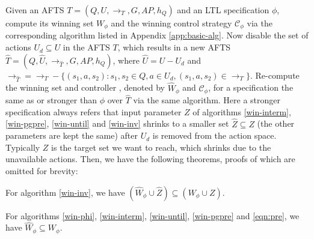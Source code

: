 Given an AFTS $ T = (Q,U,\rightarrow_T,G,AP,h_Q) $ and an LTL specification $ \phi $, compute its winning set $ W_{\phi} $ and the winning control strategy $ \mathcal{C}_{\phi} $  via the corresponding algorithm listed in Appendix \ref{app:basic-alg}. Now disable the set of actions $ U_d \subseteq U$ in the AFTS $ T $, which results in a new AFTS $ \widehat{T} = (Q,\widehat{U},\rightarrow_{\widehat{T}},G,AP,h_Q) $, where  $ \widehat{U} = U-U_d $ and $ \rightarrow_{\widehat{T}} = \rightarrow_T - \{(s_1,a,s_2):s_1,s_2\in Q, a\in U_d, (s_1,a,s_2)\in \rightarrow_T \} $. Re-compute the winning set and controller , denoted by $ \widehat{W}_{\phi} $ and $ \widehat{\mathcal{C}}_{\phi} $, for a specification the same as or stronger than $ \phi $ over $ \widehat{T} $ via the same algorithm. Here a stronger specification always refers that input parameter $ Z $ of algorithms \eqref{win-interm}, \eqref{win-pgpre}, \eqref{win-until} and  \eqref{win-inv} shrinks to a smaller set $ \widehat{Z}\subseteq Z $ (the other parameters are kept the same) after $ U_d $ is removed from the action space. Typically $ Z $ is the target set we want to reach, which shrinks due to the unavailable actions. 
Then, we have the following theorems, proofs of which are omitted for brevity:

\begin{theorem}
For algorithm \eqref{win-inv}, we have $ ( \widehat{W}_{\phi}\cup \widehat{Z}) \subseteq ( W_\phi \cup Z) $.\label{thm: inv-set}
\end{theorem}


\begin{theorem}
For algorithms \eqref{win-phi}, \eqref{win-interm}, \eqref{win-until}, \eqref{win-pgpre} and \eqref{eqn:pre}, we have $ \widehat{W}_\phi \subseteq W_\phi $.

	\label{thm: 1} 
\end{theorem}

